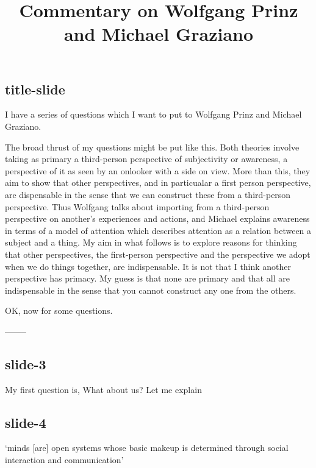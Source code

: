 \documentclass[14pt,\papersize]{extarticle}
\begin{document}
\setlength\footnotesep{1em}








      
\title {Commentary on Wolfgang Prinz and Michael Graziano}
 
 
 
\maketitle
 
\subsection{title-slide}
I have a series of questions which I want to put to Wolfgang Prinz and
Michael Graziano.
 
The broad thrust of my questions might be put like
this.  
Both theories involve taking as primary a third-person perspective of 
subjectivity or awareness, a perspective of it as seen by an onlooker with a
side on view.  
More than this, they aim to show that other perspectives, and in particualar
a first person perspective, are dispensable in the sense that we can
construct these from a third-person perspective.
Thus Wolfgang talks about importing from a third-person perspective on
another’s experiences and actions, and Michael explains awareness in terms
of a model of attention which describes attention as a relation
between a subject and a thing.
My aim in what follows is to explore reasons for thinking that 
other perspectives,
the first-person perspective and the perspective we adopt
when we do things together,
are indispensable.
It is not that I think another perspective has primacy.
My guess is that none are primary and that all are indispensable in the 
sense that you cannot construct any one from the others.
 
OK, now for some questions.
 
--------
\subsection{slide-3}
My first question is, What about us?
Let me explain
 
\subsection{slide-4}
‘minds [are] open systems whose basic makeup is determined through social interaction and communication’
\end{document}
